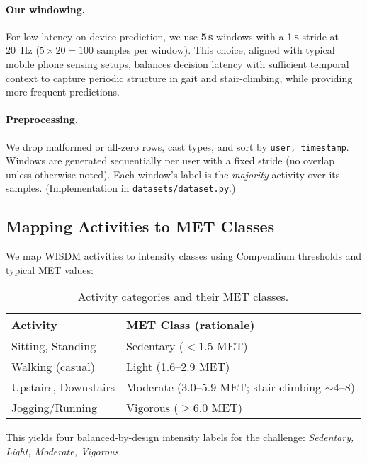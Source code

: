 \documentclass[10pt,twocolumn]{article}
\begin{document}
\paragraph{Our windowing.} For low-latency on-device prediction, we use \textbf{5\,s} windows with a \textbf{1\,s} stride at \SI{20}{Hz} (\(5\times 20=100\) samples per window). This choice, aligned with typical mobile phone sensing setups, balances decision latency with sufficient temporal context to capture periodic structure in gait and stair-climbing, while providing more frequent predictions.


\paragraph{Preprocessing.} We drop malformed or all-zero rows, cast types, and sort by \texttt{user, timestamp}. Windows are generated sequentially per user with a fixed stride (no overlap unless otherwise noted). Each window's label is the \emph{majority} activity over its samples. (Implementation in \texttt{datasets/dataset.py}.)

\subsection{Mapping Activities to MET Classes}
We map WISDM activities to intensity classes using Compendium thresholds \cite{Compendium2024,Compendium2011} and typical MET values:

\begin{table}[H]
\centering
\footnotesize
\begin{tabularx}{\columnwidth}{lX}
\toprule
\textbf{Activity} & \textbf{MET Class (rationale)} \\
\midrule
Sitting, Standing & Sedentary ($<1.5$ MET) \\
Walking (casual) & Light (1.6--2.9 MET) \\
Upstairs, Downstairs & Moderate (3.0--5.9 MET; stair climbing $\sim$4--8) \\
Jogging/Running & Vigorous ($\geq$6.0 MET) \\
\bottomrule
\end{tabularx}
\caption{Activity categories and their MET classes.}
\label{tab:met}
\end{table}

This yields four balanced-by-design intensity labels for the challenge: \emph{Sedentary, Light, Moderate, Vigorous}.
\end{document}
